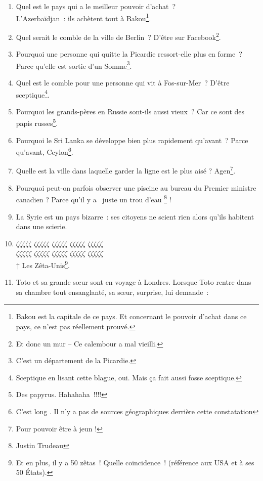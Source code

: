 \documentclass[10pt,a5paper,fullpage]{book}
\begin{document}
\begin{enumerate}
		\item Quel est le pays qui a le meilleur pouvoir d’achat~? \\L’Azerbaïdjan~: ils achètent tout à Bakou\footnote{Bakou est la capitale de ce pays. Et concernant le pouvoir d'achat dans ce pays, ce n'est pas réellement prouvé.}.
		\item Quel serait le comble de la ville de Berlin~? D'être sur Facebook\footnote{ Et donc un mur -- Ce calembour a mal vieilli.}. 
		\item Pourquoi une personne qui quitte la Picardie ressort-elle plus en forme~? Parce qu'elle est sortie d'un Somme\footnote{C'est un département de la Picardie.}. 
		\item Quel est le comble pour une personne qui vit à Fos-sur-Mer~? D'être sceptique\footnote{Sceptique en lisant cette blague, oui. Mais ça fait aussi fosse sceptique.}.
		\item Pourquoi les grands-pères en Russie sont-ils aussi vieux~? Car ce sont des papis russes\footnote{Des papyrus. Hahahaha~!!!!}.
		\item Pourquoi le Sri Lanka se développe bien plus rapidement qu'avant~? Parce qu'avant, Ceylon\footnote{\guillemotleft C'est long \guillemotright. Il n'y a pas de sources géographiques derrière cette constatation}. 
		\item Quelle est la ville dans laquelle garder la ligne est le plus aisé ? Agen\footnote{Pour pouvoir être à jeun !}.
		\item Pourquoi peut-on parfois observer une piscine au bureau du Premier ministre canadien ? Parce qu'il y a \guillemotleft~juste un trou d'eau \guillemotright \footnote{Justin Trudeau} !
		\item La Syrie est un pays bizarre~: ses citoyens ne scient rien alors qu'ils habitent dans une scierie. 
		\item $\zeta\zeta\zeta\zeta\zeta$ $\zeta\zeta\zeta\zeta\zeta$ $\zeta\zeta\zeta\zeta\zeta$ $\zeta\zeta\zeta\zeta\zeta$ $\zeta\zeta\zeta\zeta\zeta$ \\ 
		$\zeta\zeta\zeta\zeta\zeta$ $\zeta\zeta\zeta\zeta\zeta$ $\zeta\zeta\zeta\zeta\zeta$ $\zeta\zeta\zeta\zeta\zeta$  $\zeta\zeta\zeta\zeta\zeta$ \\
		↑ Les Zêta-Unis\footnote{Et en plus, il y a 50 zêtas~! Quelle coïncidence~! (référence aux USA et à ses 50 États).}.			
		\item Toto et sa grande sœur sont en voyage à Londres. Lorsque Toto rentre dans sa chambre tout ensanglanté, sa sœur, surprise, lui demande~:
		\begin{itemize}

\end{itemize}
\end{enumerate}
\end{document}
